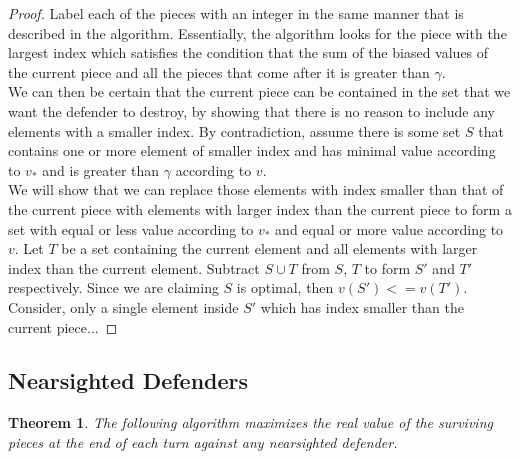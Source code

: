 \documentclass{article}
\theoremstyle{plain}
\newtheorem{thm}{Theorem}[section]
\theoremstyle{definition}
\theoremstyle{remark}
\begin{document}
\begin{proof}
Label each of the pieces with an integer in the same manner that is described in the algorithm. Essentially, the algorithm looks for the piece with the largest index which satisfies the condition that the sum of the biased values of the current piece and all the pieces that come after it is greater than $\gamma$. \\

We can then be certain that the current piece can be contained in the set that we want the defender to destroy, by showing that there is no reason to include any elements with a smaller index. By contradiction, assume there is some set $S$ that contains one or more element of smaller index and has minimal value according to $v_{*}$ and is greater than $\gamma$ according to $v$. \\

We will show that we can replace those elements with index smaller than that of the current piece with elements with larger index than the current piece to form a set with equal or less value according to $v_{*}$ and equal or more value according to $v$. Let $T$ be a set containing the current element and all elements with larger index than the current element. Subtract $S \cup T$ from $S$, $T$ to form $S'$ and $T'$ respectively. Since we are claiming $S$ is optimal, then $v(S') <=  v(T')$. \\

Consider, only a single element inside $S'$ which has index smaller than the current piece...


\end{proof}


\subsection{Nearsighted Defenders}

\begin{thm}
  The following algorithm maximizes the real value of the surviving pieces at the end of each turn against any nearsighted defender.
\end{thm}
\end{document}
